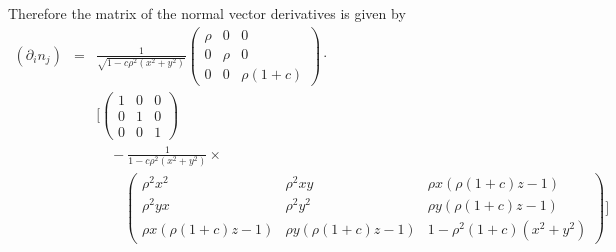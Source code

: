 \documentclass[12pt,a4paper,twoside,openright,BCOR10mm,headsepline,titlepage,abstracton,chapterprefix,final]{scrreprt}
\newcommand\Vector[1]{{\mathbf{#1}}}
\begin{document}
Therefore the matrix of the normal vector derivatives is given by
\begin{eqnarray}
 (\partial_i n_j) &=& \frac{1}{\sqrt{ 1 - c \rho^2 (x^2 + y^2)}}
\begin{pmatrix}
  \rho & 0 & 0 \\
  0 & \rho & 0 \\
  0 & 0 & \rho(1+c)
\end{pmatrix}\cdot\nonumber\\
&&
\biggl[
\begin{pmatrix}
 1 & 0 & 0 \\
 0 & 1 & 0 \\
 0 & 0 & 1
\end{pmatrix}\nonumber\\
&&\quad
- \frac{1}{1 - c \rho^2 (x^2 + y^2)}\times\nonumber\\
&&\quad\quad
\begin{pmatrix}
 \rho^2 x^2 & \rho^2 x y & \rho x (\rho (1+c) z - 1) \\
 \rho^2 y x & \rho^2 y^2 & \rho y (\rho (1+c) z - 1) \\
 \rho x (\rho (1+c) z - 1) & \rho y (\rho (1+c) z - 1) & 1-\rho^2 (1+c) (x^2+y^2)%
\end{pmatrix}
\biggr]
\end{eqnarray}


\end{document}
